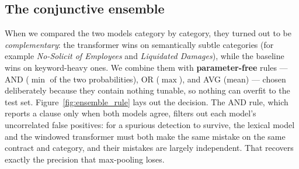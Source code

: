 \subsection{The conjunctive ensemble}
When we compared the two models category by category, they turned out to be \emph{complementary}: the transformer wins on semantically subtle categories (for example \emph{No-Solicit of Employees} and \emph{Liquidated Damages}), while the baseline wins on keyword-heavy ones. We combine them with \textbf{parameter-free} rules --- AND ($\min$ of the two probabilities), OR ($\max$), and AVG (mean) --- chosen deliberately because they contain nothing tunable, so nothing can overfit to the test set. Figure~\ref{fig:ensemble_rule} lays out the decision. The AND rule, which reports a clause only when both models agree, filters out each model's uncorrelated false positives: for a spurious detection to survive, the lexical model and the windowed transformer must both make the same mistake on the same contract and category, and their mistakes are largely independent. That recovers exactly the precision that max-pooling loses.

